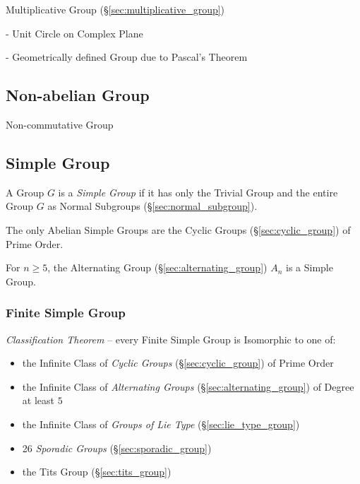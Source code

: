 Multiplicative Group (\S\ref{sec:multiplicative_group})

- Unit Circle on Complex Plane

- Geometrically defined Group due to Pascal's Theorem
  \cite{lemmermeyer-shirali09}



\subsection{Non-abelian Group}\label{sec:noncommutative_group}

Non-commutative Group



\subsection{Simple Group}\label{sec:simple_group}

A Group $G$ is a \emph{Simple Group} if it has only the Trivial Group and the
entire Group $G$ as Normal Subgroups (\S\ref{sec:normal_subgroup}).

The only Abelian Simple Groups are the Cyclic Groups
(\S\ref{sec:cyclic_group}) of Prime Order.

For $n \geq 5$, the Alternating Group (\S\ref{sec:alternating_group})
$A_n$ is a Simple Group.



\subsubsection{Finite Simple Group}\label{sec:finite_simple_group}

\emph{Classification Theorem} -- every Finite Simple Group is Isomorphic to one
of:
\begin{itemize}
  \item the Infinite Class of \emph{Cyclic Groups} (\S\ref{sec:cyclic_group}) of
    Prime Order
  \item the Infinite Class of \emph{Alternating Groups}
    (\S\ref{sec:alternating_group}) of Degree at least $5$
  \item the Infinite Class of \emph{Groups of Lie Type}
    (\S\ref{sec:lie_type_group})
  \item 26 \emph{Sporadic Groups} (\S\ref{sec:sporadic_group})
  \item the Tits Group (\S\ref{sec:tits_group})
\end{itemize}



